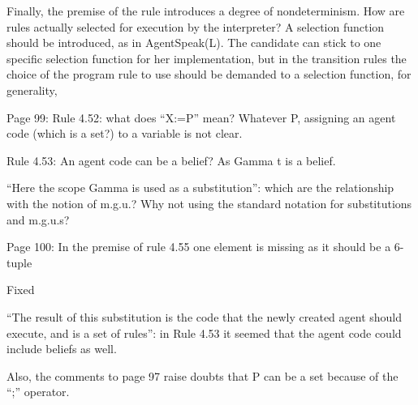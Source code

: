 \documentclass{article}
\newcommand{\todo}[1]{[\textcolor{red}{TODO}: #1]}
\newenvironment{them}{\noindent\begingroup\color{blue}}{\endgroup\par}
\begin{document}
\begin{them}

Finally, the premise of the rule introduces a degree of nondeterminism. How are
rules actually selected for execution by the interpreter? A selection function
should be introduced, as in AgentSpeak(L). The candidate can stick to one
specific selection function for her implementation, but in the transition rules
the choice of the program rule to use should be demanded to a selection
function, for generality,

\end{them}
\todo{}

\begin{them}

Page 99:
Rule 4.52: what does “X:=P” mean? Whatever P, assigning an agent code (which is
a set?) to a variable is not clear.

\end{them}
\todo{}

\begin{them}

Rule 4.53:
An agent code can be a belief? As Gamma t is a belief.
\end{them}
\todo{}

\begin{them}

“Here the scope Gamma is used as a substitution”: which are the relationship
with the notion of m.g.u.? Why not using the standard notation for
substitutions and m.g.u.s?

\end{them}
\todo{}

\begin{them}

Page 100:
In the premise of rule 4.55 one element is missing as it should be a 6-tuple
\end{them}
Fixed

\begin{them}

“The result of this substitution is the code that the newly created agent
should execute, and is a set of rules”: in Rule 4.53 it seemed that the agent
code could include beliefs as well.

\end{them}
\todo{}

\begin{them}

Also, the comments to page 97 raise doubts that P can be a set because of the
“;” operator.

\end{them}
\todo{}
\end{document}
